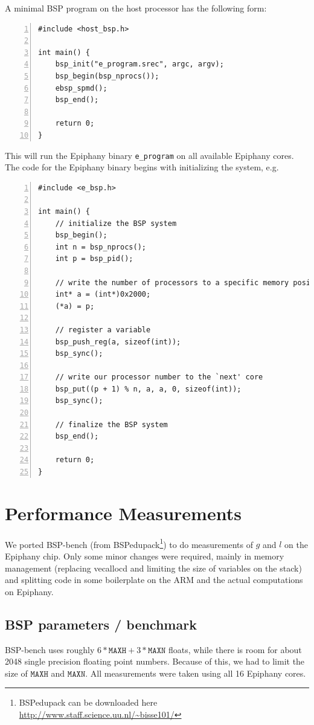\documentclass[fleqn]{article}
\renewcommand{\(}{\left(}
\renewcommand{\)}{\right)}
\begin{document}
A minimal BSP program on the host processor has the following form:
\begin{lstlisting}[numbers = left]
#include <host_bsp.h>

int main() {
    bsp_init("e_program.srec", argc, argv);
    bsp_begin(bsp_nprocs());
    ebsp_spmd();
    bsp_end();

    return 0;
}
\end{lstlisting}
This will run the Epiphany binary \verb.e_program. on all available Epiphany cores. The code for the Epiphany binary begins with initializing the system, e.g.\
\begin{lstlisting}[numbers = left]
#include <e_bsp.h>

int main() {
    // initialize the BSP system
    bsp_begin();
    int n = bsp_nprocs();
    int p = bsp_pid();

    // write the number of processors to a specific memory position
    int* a = (int*)0x2000;
    (*a) = p;

    // register a variable
    bsp_push_reg(a, sizeof(int));
    bsp_sync();

    // write our processor number to the `next' core
    bsp_put((p + 1) % n, a, a, 0, sizeof(int));
    bsp_sync();

    // finalize the BSP system
    bsp_end();

    return 0;
}
\end{lstlisting}
\section{Performance Measurements}
We ported BSP-bench (from BSPedupack\footnote{BSPedupack can be downloaded here \url{http://www.staff.science.uu.nl/~bisse101/}}) to do measurements of $g$ and $l$ on the Epiphany chip. Only some minor changes were required, mainly in memory management (replacing vecallocd and limiting the size of variables on the stack) and splitting code in some boilerplate on the ARM and the actual computations on Epiphany.

\subsection{BSP parameters / benchmark}
BSP-bench uses roughly $6*\mathtt{MAXH}+3*\mathtt{MAXN}$ floats, while there is room for about 2048 single precision floating point numbers. Because of this, we had to limit the size of $\mathtt{MAXH}$ and $\mathtt{MAXN}$. All measurements were taken using all 16 Epiphany cores.
\end{document}
